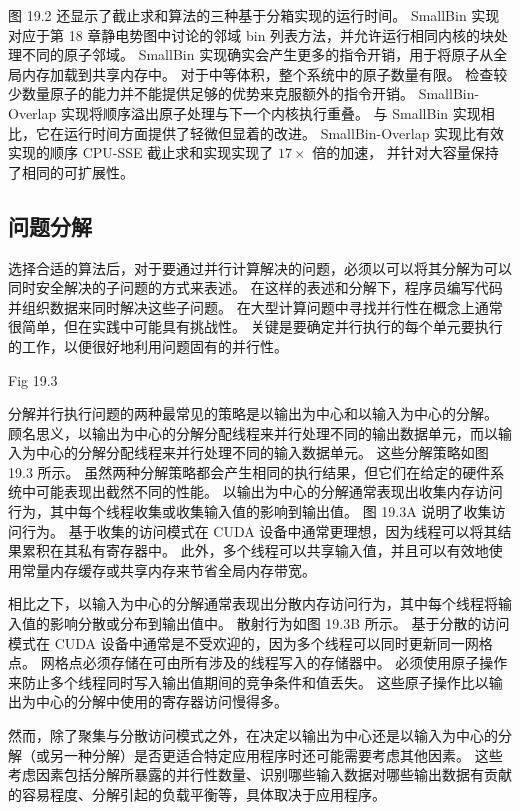 图 19.2 还显示了截止求和算法的三种基于分箱实现的运行时间。 
SmallBin 实现对应于第 18 章静电势图中讨论的邻域 bin 列表方法，并允许运行相同内核的块处理不同的原子邻域。 
SmallBin 实现确实会产生更多的指令开销，用于将原子从全局内存加载到共享内存中。 
对于中等体积，整个系统中的原子数量有限。 检查较少数量原子的能力并不能提供足够的优势来克服额外的指令开销。 
SmallBin-Overlap 实现将顺序溢出原子处理与下一个内核执行重叠。 
与 SmallBin 实现相比，它在运行时间方面提供了轻微但显着的改进。 
SmallBin-Overlap 实现比有效实现的顺序 CPU-SSE 截止求和实现实现了 $17\times$ 倍的加速，
并针对大容量保持了相同的可扩展性。

\subsection{问题分解}
选择合适的算法后，对于要通过并行计算解决的问题，必须以可以将其分解为可以同时安全解决的子问题的方式来表述。 
在这样的表述和分解下，程序员编写代码并组织数据来同时解决这些子问题。 
在大型计算问题中寻找并行性在概念上通常很简单，但在实践中可能具有挑战性。 
关键是要确定并行执行的每个单元要执行的工作，以便很好地利用问题固有的并行性。

{\color{red} Fig 19.3}

分解并行执行问题的两种最常见的策略是以输出为中心和以输入为中心的分解。 
顾名思义，以输出为中心的分解分配线程来并行处理不同的输出数据单元，而以输入为中心的分解分配线程来并行处理不同的输入数据单元。 
这些分解策略如图 19.3 所示。 虽然两种分解策略都会产生相同的执行结果，但它们在给定的硬件系统中可能表现出截然不同的性能。 
以输出为中心的分解通常表现出收集内存访问行为，其中每个线程收集或收集输入值的影响到输出值。 
图 19.3A 说明了收集访问行为。 基于收集的访问模式在 CUDA 设备中通常更理想，因为线程可以将其结果累积在其私有寄存器中。 
此外，多个线程可以共享输入值，并且可以有效地使用常量内存缓存或共享内存来节省全局内存带宽。

相比之下，以输入为中心的分解通常表现出分散内存访问行为，其中每个线程将输入值的影响分散或分布到输出值中。 
散射行为如图 19.3B 所示。 基于分散的访问模式在 CUDA 设备中通常是不受欢迎的，因为多个线程可以同时更新同一网格点。 
网格点必须存储在可由所有涉及的线程写入的存储器中。 必须使用原子操作来防止多个线程同时写入输出值期间的竞争条件和值丢失。 
这些原子操作比以输出为中心的分解中使用的寄存器访问慢得多。

然而，除了聚集与分散访问模式之外，在决定以输出为中心还是以输入为中心的分解（或另一种分解）是否更适合特定应用程序时还可能需要考虑其他因素。 
这些考虑因素包括分解所暴露的并行性数量、识别哪些输入数据对哪些输出数据有贡献的容易程度、分解引起的负载平衡等，具体取决于应用程序。

